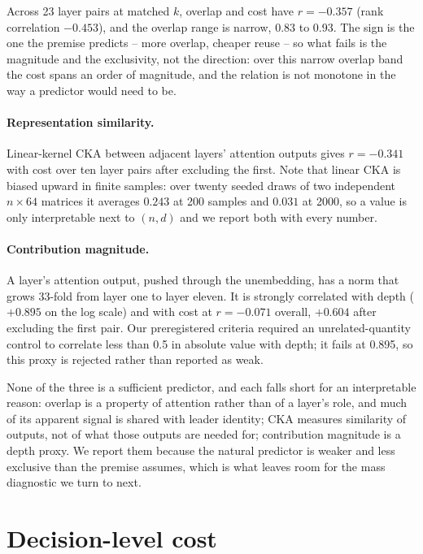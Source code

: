 \documentclass[10pt]{article}
\begin{document}
Across 23 layer pairs at matched $k$, overlap and cost have $r = -0.357$
(rank correlation $-0.453$), and the overlap range is narrow, 0.83 to 0.93.
The sign is the one the premise predicts -- more overlap, cheaper reuse -- so
what fails is the magnitude and the exclusivity, not the direction: over this
narrow overlap band the cost spans an order of magnitude, and the relation is
not monotone in the way a predictor would need to be.

\paragraph{Representation similarity.} Linear-kernel CKA between adjacent layers'
attention outputs gives $r = -0.341$ with cost over ten layer pairs after
excluding the first. Note that linear CKA is biased upward in finite samples:
over twenty seeded draws of two independent $n\times 64$ matrices it averages
$0.243$ at 200 samples and $0.031$ at 2000, so a value is only interpretable
next to $(n,d)$ and we report both with every number.

\paragraph{Contribution magnitude.} A layer's attention output, pushed through
the unembedding, has a norm that grows 33-fold from layer one to layer eleven.
It is strongly correlated with depth ($+0.895$ on the log scale) and with cost
at $r=-0.071$ overall, $+0.604$ after excluding the first pair. Our
preregistered criteria required an unrelated-quantity control to correlate
less than 0.5 in absolute value with depth; it fails at 0.895, so this proxy
is rejected rather than reported as weak.

None of the three is a sufficient predictor, and each falls short for an
interpretable reason: overlap is a property of attention rather than of a
layer's role, and much of its apparent signal is shared with leader identity;
CKA measures similarity of outputs, not of what those outputs are needed for;
contribution magnitude is a depth proxy. We report them because the natural
predictor is weaker and less exclusive than the premise assumes, which is what
leaves room for the mass diagnostic we turn to next.

\section{Decision-level cost}
\end{document}
